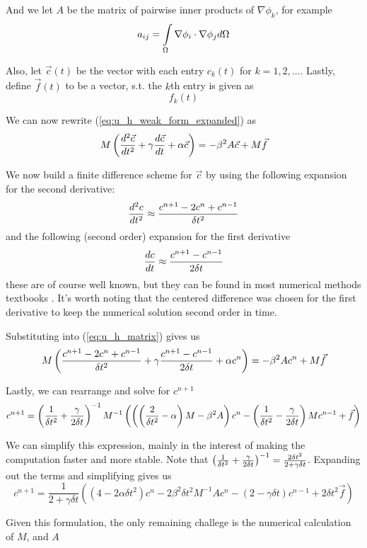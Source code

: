 And we let $A$ be the matrix of pairwise inner products of $\nabla \phi_k$, for example
\begin{equation} \label{eq:a_definition}
a_{ij} = \int\limits_{\Omega} \nabla \phi_i \cdot \nabla \phi_j d\Omega
\end{equation}

Also, let $\vec{c}(t)$ be the vector with each entry $c_k(t)$ for $k=1, 2, \ldots$. Lastly, define
$\vec{f}(t)$ to be a vector, s.t. the $k$th entry is given as 
\begin{equation} \label{eq:vec_F_definition}
f_k(t)
\end{equation}

We can now rewrite (\ref{eq:u_h_weak_form_expanded}) as
\begin{equation} \label{eq:u_h_matrix}
M\left( \frac{d^2 \vec{c}}{d t^2} + \gamma\frac{d \vec{c}}{d t} + \alpha \vec{c} \right) = - \beta^2 A \vec{c} + M\vec{f}
\end{equation}

We now build a finite difference scheme for $\vec{c}$ by using the following expansion for the second derivative:
\begin{equation} \label{eq:second_derivative_finite_difference}
\frac{d^2 c}{d t^2} \approx \frac{c^{n+1} - 2c^n + c^{n-1}}{\delta t^2}
\end{equation}
and the following (second order) expansion for the first derivative
\begin{equation} \label{eq:first_derivative_finite_difference}
\frac{d c}{d t} \approx \frac{c^{n+1} - c^{n-1}}{2\delta t}
\end{equation}
these are of course well known, but they can be found in most numerical methods textbooks \cite{difference_formulas}.
It's worth noting that the centered difference was chosen for the first derivative to keep the numerical solution second
order in time.

Substituting into (\ref{eq:u_h_matrix}) gives us
\begin{equation} \label{eq:finite_diff_weak_form}
M \left( \frac{c^{n+1} - 2c^n + c^{n-1}}{\delta t^2} + \gamma \frac{c^{n+1} - c^{n-1}}{2\delta t} + \alpha c^n \right) = - \beta^2 A c^n + M\vec{f}
\end{equation}

Lastly, we can rearrange and solve for $c^{n+1}$
\begin{equation} \label{eq:finite_diff_solution}
c^{n+1} = \left( \frac{1}{\delta t^2} + \frac{\gamma}{2\delta t} \right)^{-1} M^{-1}
\left(
\left( \left(\frac{2}{\delta t^2} - \alpha\right) M - \beta^2 A \right) c^n
-
\left( \frac{1}{\delta t^2} - \frac{\gamma}{2\delta t} \right) M c^{n-1}
+
\vec{f}
\right)
\end{equation}

We can simplify this expression, mainly in the interest of making the computation faster and more stable. Note
that $\left( \frac{1}{\delta t^2} + \frac{\gamma}{2\delta t} \right)^{-1} = \frac{2\delta t^2}{2 + \gamma\delta t}$. Expanding out the terms and simplifying gives us
\begin{equation} \label{eq:cleaner_finite_diff_solution}
c^{n+1}
=
\frac{1}{2 + \gamma\delta t} \left(
(4 - 2\alpha\delta t^2)c^n  - 2\beta^2\delta t^2M^{-1}Ac^n
- (2 - \gamma\delta t)c^{n-1}
+ 2\delta t^2 \vec{f}
\right)
\end{equation}

Given this formulation, the only remaining challege is the numerical calculation of $M$, and $A$

